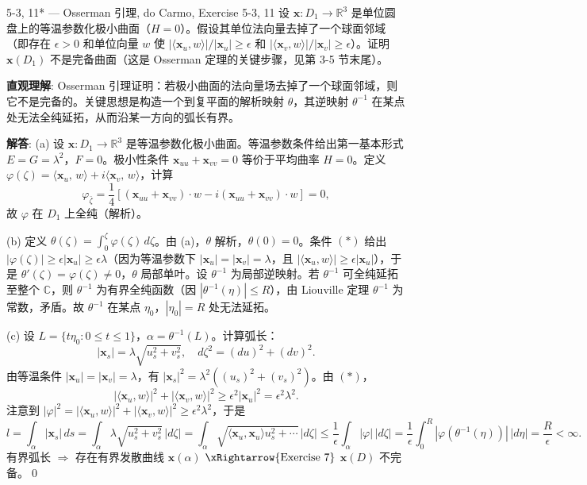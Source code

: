 \begin{exercise}{5-3, 11* — Osserman 引理, do Carmo, Exercise 5-3, 11}
设 $\mathbf{x}: D_1 \to \mathbb{R}^3$ 是单位圆盘上的等温参数化极小曲面（$H=0$）。假设其单位法向量去掉了一个球面邻域（即存在 $\epsilon>0$ 和单位向量 $w$ 使 $|\langle \mathbf{x}_u,w\rangle|/|\mathbf{x}_u| \geq \epsilon$ 和 $|\langle \mathbf{x}_v,w\rangle|/|\mathbf{x}_v| \geq \epsilon$）。证明 $\mathbf{x}(D_1)$ 不是完备曲面（这是 Osserman 定理的关键步骤，见第 3-5 节末尾）。
\end{exercise}
\begin{solution}
\textbf{直观理解}: Osserman 引理证明：若极小曲面的法向量场去掉了一个球面邻域，则它不是完备的。关键思想是构造一个到复平面的解析映射 $\theta$，其逆映射 $\theta^{-1}$ 在某点处无法全纯延拓，从而沿某一方向的弧长有界。

\textbf{解答}: (a) 设 $\mathbf{x}: D_1 \to \mathbb{R}^3$ 是等温参数化极小曲面。等温参数条件给出第一基本形式 $E=G=\lambda^2$，$F=0$。极小性条件 $\mathbf{x}_{uu}+\mathbf{x}_{vv}=0$ 等价于平均曲率 $H=0$。定义 $\varphi(\zeta) = \langle \mathbf{x}_u,\, w\rangle + i\langle \mathbf{x}_v,\, w\rangle$，计算
\[
\varphi_{\bar{\zeta}} = \frac{1}{4}\left[(\mathbf{x}_{uu}+\mathbf{x}_{vv})\cdot w - i(\mathbf{x}_{uu}+\mathbf{x}_{vv})\cdot w\right] = 0,
\]
故 $\varphi$ 在 $D_1$ 上全纯（解析）。

(b) 定义 $\theta(\zeta) = \int_0^\zeta \varphi(\zeta)\,d\zeta$。由 (a)，$\theta$ 解析，$\theta(0)=0$。条件 $(*)$ 给出 $|\varphi(\zeta)| \geq \epsilon|\mathbf{x}_u| \geq \epsilon\lambda$（因为等温参数下 $|\mathbf{x}_u|=|\mathbf{x}_v|=\lambda$，且 $|\langle\mathbf{x}_u,w\rangle| \geq \epsilon|\mathbf{x}_u|$），于是 $\theta'(\zeta) = \varphi(\zeta) \neq 0$，$\theta$ 局部单叶。设 $\theta^{-1}$ 为局部逆映射。若 $\theta^{-1}$ 可全纯延拓至整个 $\mathbb{C}$，则 $\theta^{-1}$ 为有界全纯函数（因 $|\theta^{-1}(\eta)| \leq R$），由 Liouville 定理 $\theta^{-1}$ 为常数，矛盾。故 $\theta^{-1}$ 在某点 $\eta_0$，$|\eta_0|=R$ 处无法延拓。

(c) 设 $L = \{t\eta_0: 0\leq t\leq 1\}$，$\alpha = \theta^{-1}(L)$。计算弧长：
\[
|\mathbf{x}_s| = \lambda\sqrt{u_s^2+v_s^2},\quad d\zeta^2 = (du)^2+(dv)^2.
\]
由等温条件 $|\mathbf{x}_u|=|\mathbf{x}_v|=\lambda$，有 $|\mathbf{x}_s|^2 = \lambda^2((u_s)^2+(v_s)^2)$。由 $(*)$，
\[
|\langle\mathbf{x}_u,w\rangle|^2 + |\langle\mathbf{x}_v,w\rangle|^2 \geq \epsilon^2|\mathbf{x}_u|^2 = \epsilon^2\lambda^2.
\]
注意到 $|\varphi|^2 = |\langle\mathbf{x}_u,w\rangle|^2 + |\langle\mathbf{x}_v,w\rangle|^2 \geq \epsilon^2\lambda^2$，于是
\[
l = \int_\alpha |\mathbf{x}_s|\,ds = \int_\alpha \lambda\sqrt{u_s^2+v_s^2}\,|d\zeta|
= \int_\alpha \sqrt{\langle\mathbf{x}_u,\mathbf{x}_u\rangle u_s^2 + \cdots}\,|d\zeta|
\leq \frac{1}{\epsilon}\int_\alpha |\varphi|\,|d\zeta|
= \frac{1}{\epsilon}\int_0^R |\varphi(\theta^{-1}(\eta))|\,|d\eta|
= \frac{R}{\epsilon} < \infty.
\]
有界弧长 $\Rightarrow$ 存在有界发散曲线 $\mathbf{x}(\alpha)$ $\xRightarrow{\text{Exercise 7}}$ $\mathbf{x}(D)$ 不完备。\qed
\end{solution}

